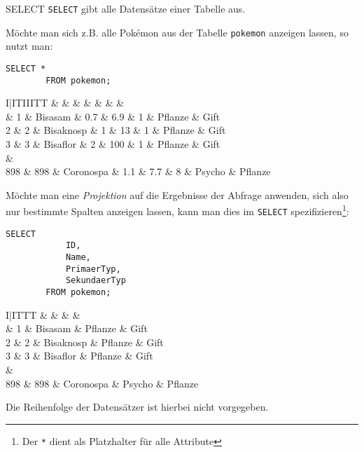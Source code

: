 \begin{sql}{SELECT}
    \texttt{SELECT} gibt alle Datensätze einer Tabelle aus.

    Möchte man sich z.B. alle Pokémon aus der Tabelle \texttt{pokemon} anzeigen lassen, so nutzt man:

    \begin{lstlisting}[style=SqlInputStyle]
        SELECT *
        FROM pokemon;
    \end{lstlisting}

    \begin{tabular}{I|ITIIITT}
        &  &  &  &  &  &  &  \\ & 1 & Bisasam & 0.7 & 6.9 & 1 & Pflanze & Gift \\
        2 & 2 & Bisaknosp & 1 & 13 & 1 & Pflanze & Gift \\
        3 & 3 & Bisaflor & 2 & 100 & 1 & Pflanze & Gift \\
         &  \\
        898 & 898 & Coronospa & 1.1 & 7.7 & 8 & Psycho & Pflanze \\
    \end{tabular}

    Möchte man eine \emph{Projektion} auf die Ergebnisse der Abfrage anwenden, sich also nur bestimmte Spalten anzeigen lassen, kann man dies im \texttt{SELECT} spezifizieren\footnote{Der \texttt{*} dient als Platzhalter für alle Attribute}:

    \begin{lstlisting}[style=SqlInputStyle]
        SELECT
            ID,
            Name,
            PrimaerTyp,
            SekundaerTyp
        FROM pokemon;
    \end{lstlisting}

    \begin{tabular}{I|ITTT}
        &  &  &  &  \\ & 1 & Bisasam & Pflanze & Gift \\
        2 & 2 & Bisaknosp & Pflanze & Gift \\
        3 & 3 & Bisaflor & Pflanze & Gift \\
         &  \\
        898 & 898 & Coronospa & Psycho & Pflanze \\
    \end{tabular}

    Die Reihenfolge der Datensätzer ist hierbei nicht vorgegeben.
\end{sql}

